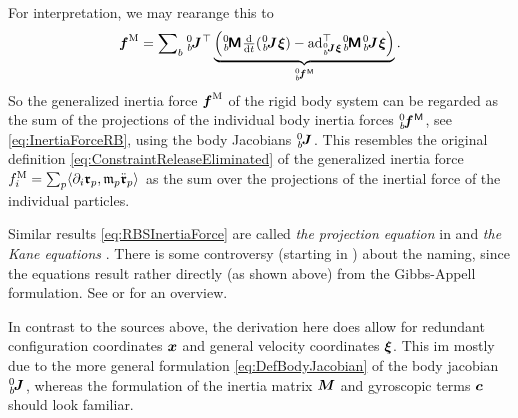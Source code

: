 For interpretation, we may rearange this to
\begin{align}\label{eq:RBSInertiaForceProj}
 \genForceInertia = \sumBodies \bodyJac{0}{\BidxII}^\top \underbrace{\Big( \bodyInertiaMat{0}{\BidxII} \ddt(\bodyJac{0}{\BidxII} \sysVel) - \ad{\bodyJac{0}{\BidxII}\sysVel}^\top \bodyInertiaMat{0}{\BidxII}\bodyJac{0}{\BidxII} \sysVel \Big)}_{\bodyGenForceInertia{0}{\BidxII}}
 .
\end{align}
So the generalized inertia force $\boldsymbol{f}^{\mathrm{M}}$ of the rigid body system can be regarded as the sum of the projections of the individual body inertia forces $\bodyGenForceInertia{0}{\BidxII}$, see \eqref{eq:InertiaForceRB}, using the body Jacobians $\bodyJac{0}{\BidxII}$.
This resembles the original definition \eqref{eq:ConstraintReleaseEliminated} of the generalized inertia force $f^{\mathrm{M}}_{i} = \sum\nolimits_{p} \langle \partial_{i} \boldsymbol{\mathfrak{r}}_{p}, \mathfrak{m}_{p} \ddot{\boldsymbol{\mathfrak{r}}}_{p} \rangle_{}$ as the sum over the projections of the inertial force of the individual particles.

Similar results \eqref{eq:RBSInertiaForce} are called \textit{the projection equation} in \cite[sec.\ 4.2.5]{Bremer:ElasticMultibodyDynamics} and \textit{the Kane equations} \cite[chap.\ 6]{Kane:Dynamics}.
There is some controversy (starting in \cite{Desloge:KaneAppell}) about the naming, since the equations result rather directly (as shown above) from the Gibbs-Appell formulation.
See \cite{Lesser:GeometricInterpretationOfKanesEquations} or \cite[p.\ 714]{Papastavridis:AnalyticalMechanics} for an overview.

In contrast to the sources above, the derivation here does allow for redundant configuration coordinates $\boldsymbol{x}$ and general velocity coordinates $\boldsymbol{\xi}$.
This im mostly due to the more general formulation \eqref{eq:DefBodyJacobian} of the body jacobian $\bodyJac{0}{\BidxII}$, whereas the formulation of the inertia matrix $\boldsymbol{M}$ and gyroscopic terms $\boldsymbol{c}$ should look familiar.

